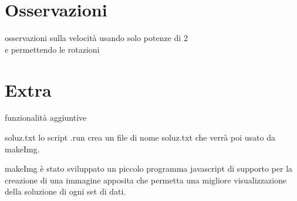 
	\section{Osservazioni}
	

osservazioni sulla velocità usando solo potenze di 2
\\

e permettendo le rotazioni


	\newpage


\section{Extra}


funzionalità aggiuntive


soluz.txt
lo script .run crea un file di nome soluz.txt che verrà poi usato da makeImg.


makeImg
è stato sviluppato un piccolo programma javascript di supporto per la creazione di una immagine apposita che permetta una migliore visualizzazione della soluzione di ogni set di dati.